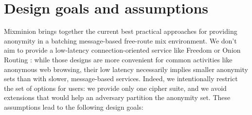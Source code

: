 \documentclass[11pt]{IEEEtran}
\begin{document}





\section{Design goals and assumptions}
\label{sec:assumptions}

Mixminion brings together the current best practical approaches
for providing anonymity in a batching message-based free-route mix
environment. We don't aim to provide a low-latency connection-oriented
service like Freedom \cite{freedom} or Onion Routing \cite{goldschlag99}:
while those designs are more convenient for common activities like
anonymous web browsing, their low latency necessarily implies smaller
anonymity sets than with slower, message-based services. Indeed, we
intentionally restrict the set of options for users: we provide only one
cipher suite, and we avoid extensions that would help an adversary partition
the anonymity set. These assumptions lead to the following design goals:
\end{document}
